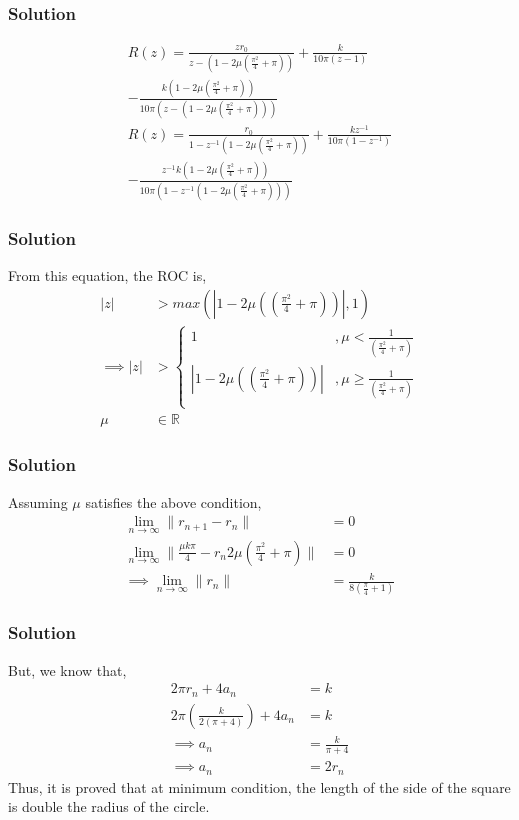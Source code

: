 \documentclass{beamer}
\providecommand{\brak}[1]{\ensuremath{\left(#1\right)}}
\theoremstyle{remark}
\providecommand{\abs}[1]{\left\vert#1\right\vert}
\providecommand{\norm}[1]{\lVert#1\rVert}
\numberwithin{equation}{section}
\begin{document}
		\begin{frame}
      \frametitle{Solution}

			\begin{multline}
	R\brak{z} = \frac{zr_0}{z - \brak{1 - 2\mu\brak{\frac{\pi^2}{4} + \pi}}} + \frac{k}{10 \pi \brak{z - 1}} \\- \frac{k \brak{1 - 2\mu\brak{\frac{\pi^2}{4} + \pi}}}{10 \pi \brak{z - \brak{1 - 2\mu\brak{\frac{\pi^2}{4} + \pi}}}}\\
	R\brak{z} = \frac{r_0}{1 - z^{-1}\brak{1 - 2\mu\brak{\frac{\pi^2}{4} + \pi}}} + \frac{kz^{-1}}{10 \pi \brak{1 - z^{-1}}} \\- \frac{z^{-1}k \brak{1 - 2\mu\brak{\frac{\pi^2}{4} + \pi}}}{10 \pi \brak{1 - z^{-1}\brak{1 - 2\mu\brak{\frac{\pi^2}{4} + \pi}}}}
			\end{multline}

		\end{frame}
		\begin{frame}
      \frametitle{Solution}
			From this equation, the ROC is,
\begin{align}
	\abs{z} &> max\brak{\abs{1 - 2\mu\brak{\brak{\frac{\pi^2}{4} + \pi}}},1}\\
	\implies \abs{z} &>
	\begin{cases}
		1 &, \mu < \frac{1}{\brak{\frac{\pi^2}{4} + \pi}}\\
		\abs{1 - 2\mu\brak{\brak{\frac{\pi^2}{4} + \pi}}} &, \mu \geq \frac{1}{\brak{\frac{\pi^2}{4} + \pi}}\\
	\end{cases}\\
	\mu &\in \mathbb{R}
\end{align}
		\end{frame}
		\begin{frame}
      \frametitle{Solution}
			Assuming $\mu$ satisfies the above condition,
\begin{align}
	\lim_{n\to\infty}\norm{r_{n+1} - r_n} &= 0\\
	\lim_{n\to\infty}\norm{\frac{\mu k\pi}{4} - r_n2\mu\brak{\frac{\pi^2}{4} + \pi}} &= 0\\
	\implies \lim_{n\to\infty}\norm{r_n} &= \frac{k}{8\brak{\frac{\pi}{4} + 1}}
\end{align}
		\end{frame}
		\begin{frame}
      \frametitle{Solution}
			But, we know that,
\begin{align}
	2\pi r_n + 4a_n &= k\\
	2\pi \brak{\frac{k}{2\brak{\pi + 4}}} + 4a_n &= k\\
	\implies a_n &= \frac{k}{\pi + 4}\\
	\implies a_n &= 2r_n
\end{align}
Thus, it is proved that at minimum condition, the length of the side of the square is double the radius of the circle.
		\end{frame}
\end{document}
